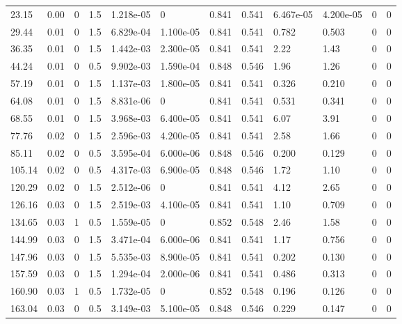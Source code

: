 \documentclass[preview]{standalone}
\begin{document}
{{\begin{tabular}{L{1.2cm}C{1.2cm} C{0.3cm}C{0.5cm} C{1.4cm}C{1.4cm} C{1.4cm}C{1.4cm} C{1.6cm}C{1.6cm} C{1.6cm}C{1.6cm}}
  23.15  &  0.00  & 0     & 1.5 &  1.218e-05  & 0  &  0.841&   0.541& 6.467e-05 & 4.200e-05   &  0 & 0  \\ 
  29.44  &  0.01  & 0     & 1.5 &  6.829e-04  & 1.100e-05  &  0.841&   0.541& 0.782 & 0.503   &  0 & 0  \\ 
  36.35  &  0.01  & 0     & 1.5 &  1.442e-03  & 2.300e-05  &  0.841&   0.541& 2.22 & 1.43   &  0 & 0  \\ 
  44.24  &  0.01  & 0     & 0.5 &  9.902e-03  & 1.590e-04  &  0.848&   0.546& 1.96 & 1.26   &  0 & 0  \\ 
  57.19  &  0.01  & 0     & 1.5 &  1.137e-03  & 1.800e-05  &  0.841&   0.541& 0.326 & 0.210   &  0 & 0  \\ 
  64.08  &  0.01  & 0     & 1.5 &  8.831e-06  & 0  &  0.841&   0.541& 0.531 & 0.341   &  0 & 0  \\ 
  68.55  &  0.01  & 0     & 1.5 &  3.968e-03  & 6.400e-05  &  0.841&   0.541& 6.07 & 3.91   &  0 & 0  \\ 
  77.76  &  0.02  & 0     & 1.5 &  2.596e-03  & 4.200e-05  &  0.841&   0.541& 2.58 & 1.66   &  0 & 0  \\ 
  85.11  &  0.02  & 0     & 0.5 &  3.595e-04  & 6.000e-06  &  0.848&   0.546& 0.200 & 0.129   &  0 & 0  \\ 
  105.14  &  0.02  & 0     & 0.5 &  4.317e-03  & 6.900e-05  &  0.848&   0.546& 1.72 & 1.10   &  0 & 0  \\ 
  120.29  &  0.02  & 0     & 1.5 &  2.512e-06  & 0  &  0.841&   0.541& 4.12 & 2.65   &  0 & 0  \\ 
  126.16  &  0.03  & 0     & 1.5 &  2.519e-03  & 4.100e-05  &  0.841&   0.541& 1.10 & 0.709   &  0 & 0  \\ 
  134.65  &  0.03  & 1     & 0.5 &  1.559e-05  & 0  &  0.852&   0.548& 2.46 & 1.58   &  0 & 0  \\ 
  144.99  &  0.03  & 0     & 1.5 &  3.471e-04  & 6.000e-06  &  0.841&   0.541& 1.17 & 0.756   &  0 & 0  \\ 
  147.96  &  0.03  & 0     & 1.5 &  5.535e-03  & 8.900e-05  &  0.841&   0.541& 0.202 & 0.130   &  0 & 0  \\ 
  157.59  &  0.03  & 0     & 1.5 &  1.294e-04  & 2.000e-06  &  0.841&   0.541& 0.486 & 0.313   &  0 & 0  \\ 
  160.90  &  0.03  & 1     & 0.5 &  1.732e-05  & 0  &  0.852&   0.548& 0.196 & 0.126   &  0 & 0  \\ 
  163.04  &  0.03  & 0     & 0.5 &  3.149e-03  & 5.100e-05  &  0.848&   0.546& 0.229 & 0.147   &  0 & 0  \\ 

\end{tabular}}}
\end{document}
